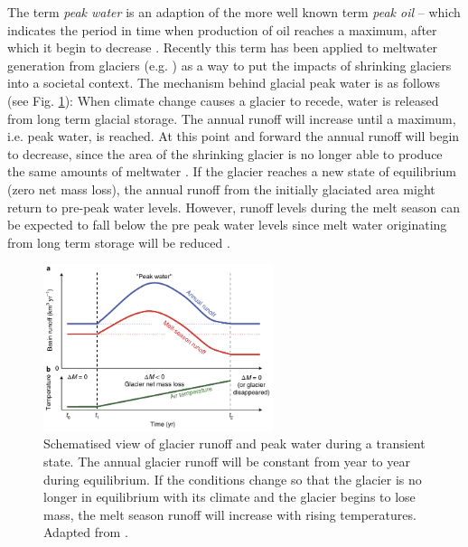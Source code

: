 \documentclass[12pt, a4paper]{article}
\begin{document}
The term \emph{peak water} is an adaption of the more well known term \emph{peak
oil} -- which indicates the period in time when production of oil reaches a
maximum, after which it begin to decrease \parencite{gleickPeakWaterLimits2010}.
Recently this term has been applied to meltwater generation from glaciers (e.g.
\cite{hussGlobalscaleHydrologicalResponse2018}) as a way to put the impacts of
shrinking glaciers into a societal context. The mechanism behind glacial peak
water is as follows (see Fig. \ref{fig:peak_water}): When climate change causes
a glacier to recede, water is released from long term glacial storage. The
annual runoff will increase until a maximum, i.e. peak water, is reached. At
this point and forward the annual runoff will begin to decrease, since the area
of the shrinking glacier is no longer able to produce the same amounts of
meltwater \parencite{janssonConceptGlacierStorage2003}. If the glacier reaches a
new state of equilibrium (zero net mass loss), the annual runoff from the
initially glaciated area might return to pre-peak water levels. However, runoff
levels during the melt season can be expected to fall below the pre peak water
levels since melt water originating from long term storage will be reduced
\parencite{hussGlobalscaleHydrologicalResponse2018,
ragettliContrastingClimateChange2016, immerzeelRisingRiverFlows2013}.
\begin{figure}[h]
    \centering
    \includegraphics[width=0.6\textwidth]{../peak_water.png}
    \caption{Schematised view of glacier runoff and peak water during a
    transient state. The annual glacier runoff will be constant from year to
    year during equilibrium. If the conditions change so that the glacier is no
    longer in equilibrium with its climate and the glacier begins to lose mass,
    the melt season runoff will increase with rising temperatures.
    Adapted from \textcite{hussGlobalscaleHydrologicalResponse2018}.}
    \label{fig:peak_water}
\end{figure}
\end{document}
